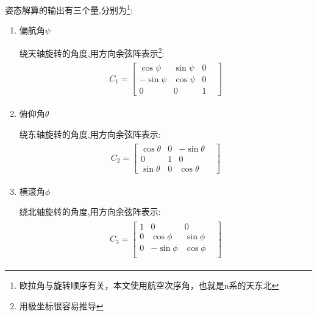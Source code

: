 \documentclass[12pt,a4paper]{article}
\renewcommand{\citep}[1]{\textsuperscript{\cite{#1}}}
\begin{document}
姿态解算的输出有三个量,分别为\footnote{欧拉角与旋转顺序有关，本文使用航空次序角，也就是n系的天东北}:
\begin{enumerate}
    \item 偏航角$\psi$

        绕天轴旋转的角度,用方向余弦阵表示\footnote{用极坐标很容易推导\citep{二维旋转}}: 
        \begin{eqnarray}\label{偏航角方向余弦}
            \begin{split}
                C_1=\left[\begin{matrix}
                         \cos{\psi} & \sin{\psi} & 0 & \\
                        -\sin{\psi} & \cos{\psi} & 0 & \\
                                 0 &          0 & 1 &
                \end{matrix}\right]
            \end{split}
        \end{eqnarray}
    \item 俯仰角$\theta$

        绕东轴旋转的角度,用方向余弦阵表示: 
        \begin{eqnarray}\label{俯仰角方向余弦}
            \begin{split}
                C_2=\left[\begin{matrix}
                        \cos{\theta} & 0 & -\sin{\theta} & \\
                                   0 & 1 &           0 & \\
                        \sin{\theta} & 0 &  \cos{\theta} &
                \end{matrix}\right]
            \end{split}
        \end{eqnarray}
    \item 横滚角$\phi$

        绕北轴旋转的角度,用方向余弦阵表示: 
        \begin{eqnarray}\label{横滚角方向余弦}
            \begin{split}
                C_3=\left[\begin{matrix}
                        1 &           0 &          0 & \\
                        0 &  \cos{\phi} & \sin{\phi} & \\
                        0 & -\sin{\phi} & \cos{\phi} & \\
                \end{matrix}\right]
            \end{split}
        \end{eqnarray}
\end{enumerate}
\end{document}
